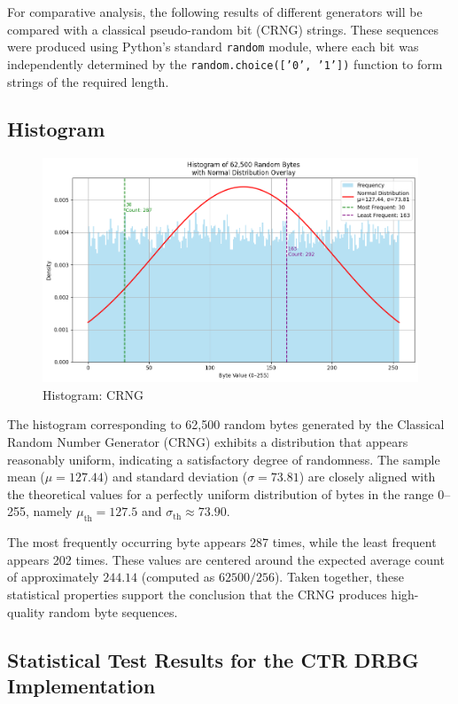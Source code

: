 For comparative analysis, the following results of different generators will be compared with a classical pseudo-random bit (CRNG) strings. These sequences were produced using Python's standard \texttt{random} module, where each bit was independently determined by the \texttt{random.choice(['0', '1'])} function to form strings of the required length.


\subsection{\textbf{Histogram}}


\begin{figure}[htbp] 
    \centering 
    \includegraphics[width=0.9\columnwidth]{images/Hist_CRNG.png} 
    \caption{Histogram: CRNG}
    \label{fig:H:CRNG}
\end{figure}

The histogram corresponding to 62{,}500 random bytes generated by the Classical Random Number Generator (CRNG) exhibits a distribution that appears reasonably uniform, indicating a satisfactory degree of randomness. The sample mean ($\mu = 127.44$) and standard deviation ($\sigma = 73.81$) are closely aligned with the theoretical values for a perfectly uniform distribution of bytes in the range 0--255, namely $\mu_{\text{th}} = 127.5$ and $\sigma_{\text{th}} \approx 73.90$.

The most frequently occurring byte appears 287 times, while the least frequent appears 202 times. These values are centered around the expected average count of approximately $244.14$ (computed as $62500 / 256$). Taken together, these statistical properties support the conclusion that the CRNG produces high-quality random byte sequences.


\subsection{Statistical Test Results for the CTR DRBG Implementation} 

